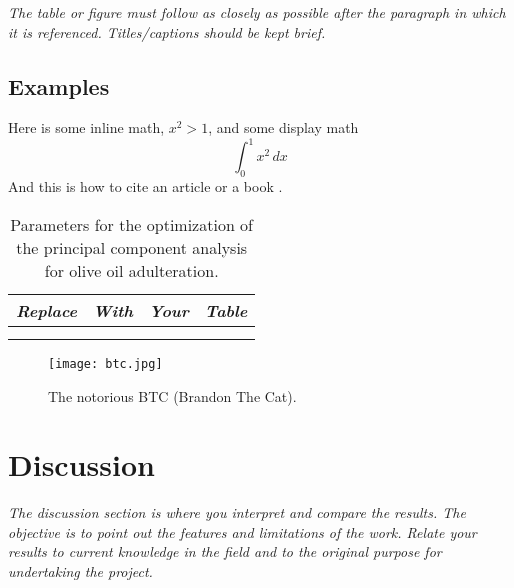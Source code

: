 \documentclass[11pt,a4paper,oneside]{report}
\newcommand{\instructions}[1]{{\color{orange}\itshape #1}}
\begin{document}
\instructions{The table or figure must follow as closely as possible after the
    paragraph in which it is referenced. Titles/captions should be kept
    brief.}

\instructions{
    \section{Examples}

    Here is some inline math, $x^2 > 1$, and some display math
    \begin{equation}
        \int_0^1 x^2 \, dx
    \end{equation}
    And this is how to cite an article \cite{Zhang2021} or a book \cite{Axler2020}.

    \begin{table}[htbp]
        \centering
        \begin{tabular}{@{}llll@{}}
            \toprule
            \emph{Replace} & \emph{With} & \emph{Your} & \emph{Table} \\
            \midrule
                           &             &             &              \\
                           &             &             &              \\
            \bottomrule
        \end{tabular}
        \caption{Parameters for the optimization of the principal component analysis for
            olive oil adulteration.}
        \label{tbl:2}
    \end{table}


    \begin{figure}[htbp]
        \centering
        \texttt{[image: btc.jpg]}
        \caption{The notorious BTC (Brandon The Cat).}
        \label{fig:1}
    \end{figure}
}




\chapter{Discussion}
\label{discussion}

\instructions{The discussion section is where you interpret and compare the
    results. The objective is to point out the features and limitations of
    the work. Relate your results to current knowledge in the field and to
    the original purpose for undertaking the project.}
\end{document}
